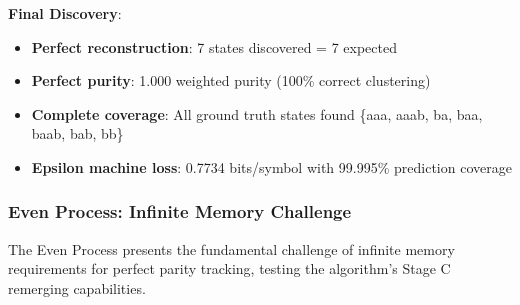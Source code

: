 \documentclass[11pt]{article}
\begin{document}
\begin{resultbox}
\textbf{Final Discovery}:
\begin{itemize}
\item \textbf{Perfect reconstruction}: 7 states discovered = 7 expected
\item \textbf{Perfect purity}: 1.000 weighted purity (100\% correct clustering)
\item \textbf{Complete coverage}: All ground truth states found \{aaa, aaab, ba, baa, baab, bab, bb\}
\item \textbf{Epsilon machine loss}: 0.7734 bits/symbol with 99.995\% prediction coverage
\end{itemize}
\end{resultbox}

\subsubsection{Even Process: Infinite Memory Challenge}

The Even Process presents the fundamental challenge of infinite memory requirements for perfect parity tracking, testing the algorithm's Stage C remerging capabilities.
\end{document}

